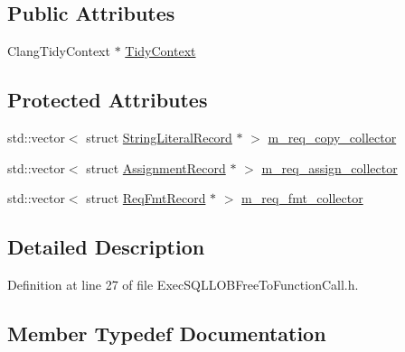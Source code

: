 \subsection*{Public Attributes}
\begin{DoxyCompactItemize}
\item 
Clang\+Tidy\+Context $\ast$ \hyperlink{classclang_1_1tidy_1_1pagesjaunes_1_1_exec_s_q_l_l_o_b_free_to_function_call_a8a10bcf195371f56a58da7859ae85407}{Tidy\+Context}
\end{DoxyCompactItemize}
\subsection*{Protected Attributes}
\begin{DoxyCompactItemize}
\item 
std\+::vector$<$ struct \hyperlink{structclang_1_1tidy_1_1pagesjaunes_1_1_exec_s_q_l_l_o_b_free_to_function_call_1_1_string_literal_record}{String\+Literal\+Record} $\ast$ $>$ \hyperlink{classclang_1_1tidy_1_1pagesjaunes_1_1_exec_s_q_l_l_o_b_free_to_function_call_a93c9411b12593255adb0b9989240e003}{m\+\_\+req\+\_\+copy\+\_\+collector}
\item 
std\+::vector$<$ struct \hyperlink{structclang_1_1tidy_1_1pagesjaunes_1_1_exec_s_q_l_l_o_b_free_to_function_call_1_1_assignment_record}{Assignment\+Record} $\ast$ $>$ \hyperlink{classclang_1_1tidy_1_1pagesjaunes_1_1_exec_s_q_l_l_o_b_free_to_function_call_a2b2cacf13fc355e116e846a410c13e1a}{m\+\_\+req\+\_\+assign\+\_\+collector}
\item 
std\+::vector$<$ struct \hyperlink{structclang_1_1tidy_1_1pagesjaunes_1_1_exec_s_q_l_l_o_b_free_to_function_call_1_1_req_fmt_record}{Req\+Fmt\+Record} $\ast$ $>$ \hyperlink{classclang_1_1tidy_1_1pagesjaunes_1_1_exec_s_q_l_l_o_b_free_to_function_call_ad572e7a4513c21f8a3439c97710679f2}{m\+\_\+req\+\_\+fmt\+\_\+collector}
\end{DoxyCompactItemize}


\subsection{Detailed Description}


Definition at line 27 of file Exec\+S\+Q\+L\+L\+O\+B\+Free\+To\+Function\+Call.\+h.



\subsection{Member Typedef Documentation}
\mbox{\label{classclang_1_1tidy_1_1pagesjaunes_1_1_exec_s_q_l_l_o_b_free_to_function_call_a315d9200c75931dbd556e1280b5c8763}} 
